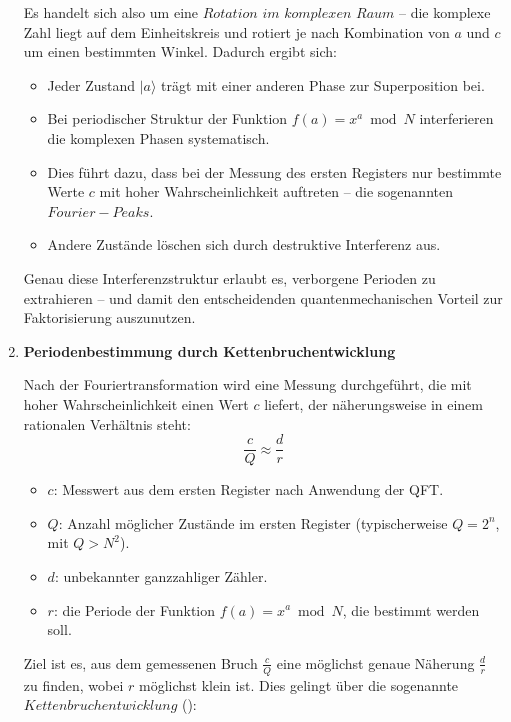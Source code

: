 \begin{enumerate}
\noindent Es handelt sich also um eine \(Rotation\) \(im\) \(komplexen\) \(Raum\) – die komplexe Zahl liegt auf dem Einheitskreis und rotiert je nach Kombination von \( a \) und \( c \) um einen bestimmten Winkel. Dadurch ergibt sich:

\begin{itemize}
    \item Jeder Zustand \( |a\rangle \) trägt mit einer anderen Phase zur Superposition bei.
    \item Bei periodischer Struktur der Funktion \( f(a) = x^a \bmod N \) interferieren die komplexen Phasen systematisch.
    \item Dies führt dazu, dass bei der Messung des ersten Registers nur bestimmte Werte \( c \) mit hoher Wahrscheinlichkeit auftreten – die sogenannten \(Fourier-Peaks\).
    \item Andere Zustände löschen sich durch destruktive Interferenz aus.
\end{itemize}

\noindent Genau diese Interferenzstruktur erlaubt es, verborgene Perioden zu extrahieren – und damit den entscheidenden quantenmechanischen Vorteil zur Faktorisierung auszunutzen.\\

\item \textbf{Periodenbestimmung durch Kettenbruchentwicklung}

\noindent Nach der Fouriertransformation wird eine Messung durchgeführt, die mit hoher Wahrscheinlichkeit einen Wert \( c \) liefert, der näherungsweise in einem rationalen Verhältnis steht:
\[
\frac{c}{Q} \approx \frac{d}{r}
\]

\begin{itemize}
    \item \( c \): Messwert aus dem ersten Register nach Anwendung der QFT.
    \item \( Q \): Anzahl möglicher Zustände im ersten Register (typischerweise \( Q = 2^n \), mit \( Q > N^2 \)).
    \item \( d \): unbekannter ganzzahliger Zähler.
    \item \( r \): die Periode der Funktion \( f(a) = x^a \bmod N \), die bestimmt werden soll.
\end{itemize}

\noindent Ziel ist es, aus dem gemessenen Bruch \( \frac{c}{Q} \) eine möglichst genaue Näherung \( \frac{d}{r} \) zu finden, wobei \( r \) möglichst klein ist. Dies gelingt über die sogenannte \(Kettenbruchentwicklung\) (\cite[18-19]{shor_polynomial-time_1994}):


\end{enumerate}
